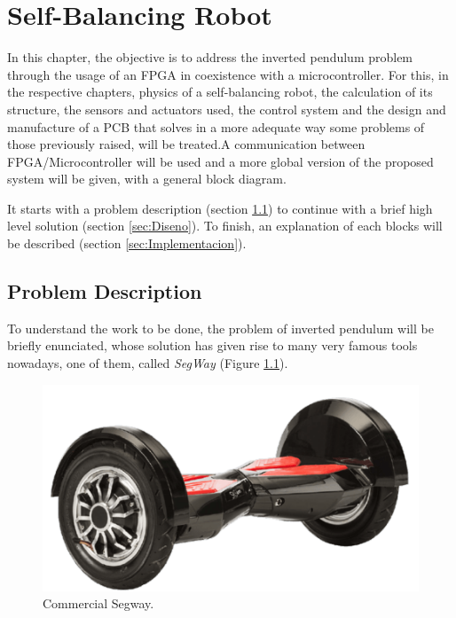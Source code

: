 \chapter{Self-Balancing Robot}\label{sec: BalancingRobot}
In this chapter, the objective is to address the inverted pendulum problem through the usage of an FPGA in coexistence with a microcontroller. For this, in the respective chapters, physics of a self-balancing robot, the calculation of its structure, the sensors and actuators used, the control system and the design and manufacture of a PCB that solves in a more adequate way some problems of those previously raised, will be treated.A communication between FPGA/Microcontroller will be used and a more global version of the proposed system will be given, with a general block diagram. \newline

It starts with a problem description (section \ref{sec:Descripcion_balancin}) to continue with a brief high level solution (section \ref{sec:Diseno}). To finish, an explanation of each blocks will be described (section \ref{sec:Implementacion}).

\section{Problem Description} \label{sec:Descripcion_balancin}

To understand the work to be done, the problem of inverted pendulum will be briefly enunciated, whose solution has given rise to many very famous tools nowadays, one of them, called \textit{SegWay} (Figure \ref{fig:segway}).

\begin{figure}[H]
	\center
	\includegraphics[trim = 0mm 0mm 0mm 0mm, clip,scale=0.4]{imagenes/Balancing_robot/segway}
	\caption{Commercial Segway.}
	\label{fig:segway}
\end{figure}


